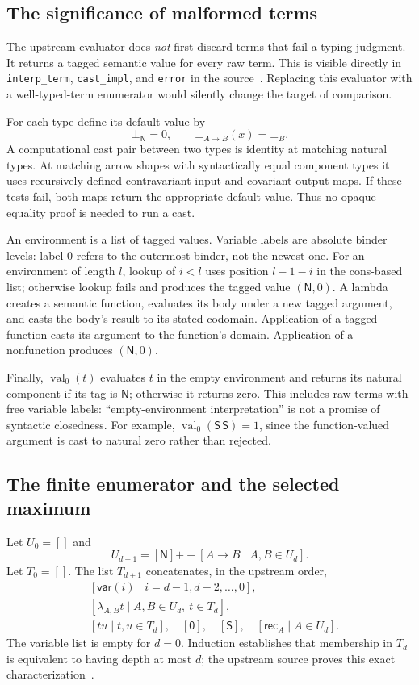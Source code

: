 \documentclass[11pt]{article}
\theoremstyle{definition}
\newcommand{\tyN}{\mathsf N}
\newcommand{\val}{\operatorname{val}}
\newcommand{\Sc}{\mathsf S}
\newcommand{\Rc}{\mathsf{rec}}
\newcommand{\code}[1]{\texttt{#1}}
\begin{document}
\subsection{The significance of malformed terms}

The upstream evaluator does \emph{not} first discard terms that fail a typing
judgment. It returns a tagged semantic value for every raw term. This is
visible directly in \code{interp\_term}, \code{cast\_impl}, and
\code{error} in the source~\cite{contender}. Replacing this evaluator with a
well-typed-term enumerator would silently change the target of comparison.

For each type define its default value by
\[
 \bot_{\tyN}=0,\qquad \bot_{A\to B}(x)=\bot_B.
\]
A computational cast pair between two types is identity at matching natural
types. At matching arrow shapes with syntactically equal component types it
uses recursively defined contravariant input and covariant output maps. If
these tests fail, both maps return the appropriate default value. Thus no
opaque equality proof is needed to run a cast.

An environment is a list of tagged values. Variable labels are absolute
binder levels: label 0 refers to the outermost binder, not the newest one.
For an environment of length $l$, lookup of $i<l$ uses position $l-1-i$ in the
cons-based list; otherwise lookup fails and produces the tagged value
$(\tyN,0)$. A lambda creates a semantic function, evaluates its body under a
new tagged argument, and casts the body's result to its stated codomain.
Application of a tagged function casts its argument to the function's domain.
Application of a nonfunction produces $(\tyN,0)$.

Finally, $\val_0(t)$ evaluates $t$ in the empty environment and returns its
natural component if its tag is $\tyN$; otherwise it returns zero. This
includes raw terms with free variable labels: ``empty-environment
interpretation'' is not a promise of syntactic closedness. For example,
$\val_0(\Sc\,\Sc)=1$, since the function-valued argument is cast to natural
zero rather than rejected.

\subsection{The finite enumerator and the selected maximum}

Let $U_0=[]$ and
\[
 U_{d+1}=[\tyN]\mathbin{+\!+}[A\to B\mid A,B\in U_d].
\]
Let $T_0=[]$. The list $T_{d+1}$ concatenates, in the upstream order,
\begin{align*}
 &[\mathsf{var}(i)\mid i=d-1,d-2,\ldots,0],\\
 &[\lambda_{A,B}t\mid A,B\in U_d,\ t\in T_d],\\
 &[tu\mid t,u\in T_d],\quad [\mathsf0],\quad[\Sc],\quad
 [\Rc_A\mid A\in U_d].
\end{align*}
The variable list is empty for $d=0$. Induction establishes that membership in
$T_d$ is equivalent to having depth at most $d$; the upstream source proves
this exact characterization~\cite{contender}.
\end{document}
